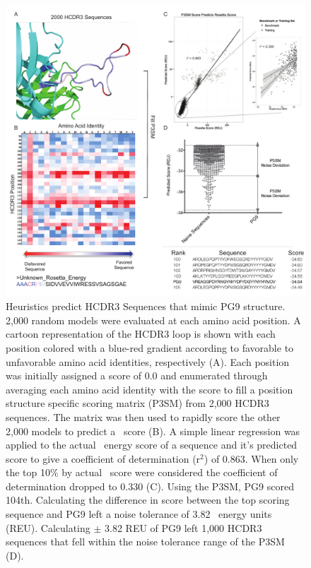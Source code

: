 \begin{figure}[!t]
   \centering
   \includegraphics[width=.9\linewidth]{images/chapter3/figure3_10.pdf} %
   \caption[Heuristics Predict HCDR3 Sequences that Mimic PG9 Structure]{Heuristics predict HCDR3 Sequences that mimic PG9 structure. 2,000 random models were evaluated at each amino acid position. A cartoon representation of the HCDR3 loop is shown with each position colored with a blue-red gradient according to favorable to unfavorable amino acid identities, respectively (A). Each position was initially assigned a score of 0.0 and enumerated through averaging each amino acid identity with the score to fill a position structure specific scoring matrix (P3SM) from 2,000 HCDR3 sequences. The matrix was then used to rapidly score the other 2,000 models to predict a \rosetta~score (B). A simple linear regression was applied to the actual \rosetta~energy score of a sequence and it's predicted score to give a coefficient of determination (r$^{2}$) of 0.863. When only the top 10\% by actual \rosetta~score were considered the coefficient of determination dropped to 0.330 (C). Using the P3SM, PG9 scored 104th. Calculating the difference in score between the top scoring sequence and PG9 left a noise tolerance of 3.82 \rosetta~energy units (REU). Calculating $\pm$ 3.82 REU of PG9 left 1,000 HCDR3 sequences that fell within the noise tolerance range of the P3SM (D).}
   \label{fig:figure3_10}
\end{figure}


